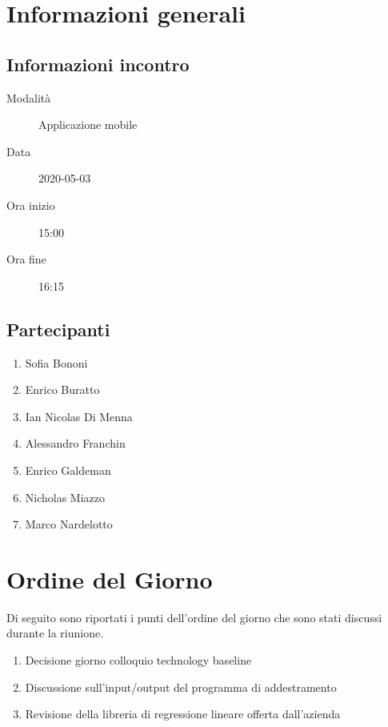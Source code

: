 \documentclass{article}
\begin{document}


\section{Informazioni generali}%
\label{sec:informazioni_generali}

\subsection{Informazioni incontro}%
\label{sub:informazioni_incontro}

\begin{description}
  \item[Modalità] Applicazione mobile 
  \item[Data] 2020-05-03
  \item[Ora inizio] 15:00
  \item[Ora fine] 16:15
\end{description}

\subsection{Partecipanti}%
\label{sub:partecipanti}

\begin{enumerate}
  \item Sofia Bononi
  \item Enrico Buratto
  \item Ian Nicolas Di Menna
  \item Alessandro Franchin
  \item Enrico Galdeman
  \item Nicholas Miazzo
  \item Marco Nardelotto
\end{enumerate}

\section{Ordine del Giorno}%
\label{ordine_del_giorno}
Di seguito sono riportati i punti dell'ordine del giorno che sono stati discussi durante la riunione.
\begin{enumerate}
  \item Decisione giorno colloquio technology baseline
  \item Discussione sull'input/output del programma di addestramento
  \item Revisione della libreria di regressione lineare offerta dall'azienda
\end{enumerate}
\end{document}
